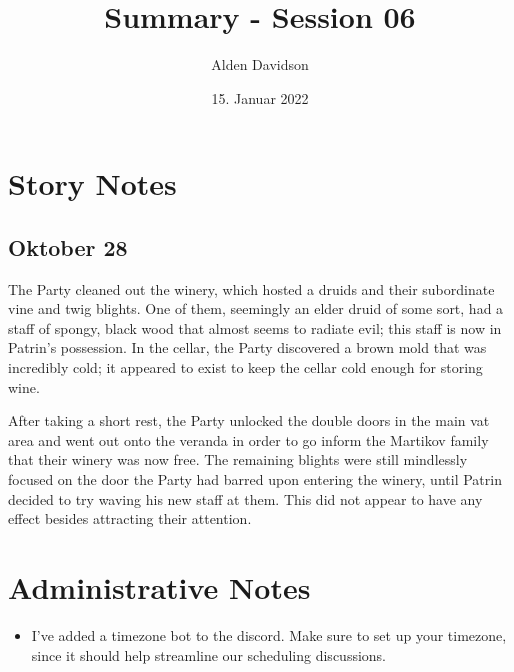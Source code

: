 \documentclass[a4paper,11pt]{article}
\title{Summary - Session 06}
\author{Alden Davidson}
\date{15. Januar 2022}
\begin{document}
\maketitle

\section{Story Notes}
\subsection{Oktober 28}
The Party cleaned out the winery, which hosted a druids and their subordinate vine and twig blights. One of them,
seemingly an elder druid of some sort, had a staff of spongy, black wood that almost seems to radiate evil; this 
staff is now in Patrin's possession. In the cellar, the Party discovered a brown mold that was incredibly cold; it 
appeared to exist to keep the cellar cold enough for storing wine.

After taking a short rest, the Party unlocked the double doors in the main vat area and went out onto the veranda in 
order to go inform the Martikov family that their winery was now free. The remaining blights were still mindlessly 
focused on the door the Party had barred upon entering the winery, until Patrin decided to try waving his new staff 
at them. This did not appear to have any effect besides attracting their attention.

\section{Administrative Notes}
\begin{itemize}
  \item I've added a timezone bot to the discord. Make sure to set up your timezone, since it should help streamline 
  our scheduling discussions.
\end{itemize}
\end{document}
